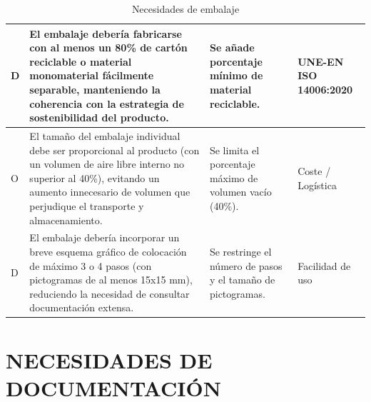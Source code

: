\documentclass[11pt,a4paper]{article}
\begin{document}
\begin{table}[H]
\begin{tabular}{|p{2.8cm}|p{5.5cm}|p{2.5cm}|p{3.0cm}|}
\hline
D & El embalaje debería fabricarse con al menos un 80\% de cartón reciclable o material monomaterial fácilmente separable, manteniendo la coherencia con la estrategia de sostenibilidad del producto. & Se añade porcentaje mínimo de material reciclable. & UNE-EN ISO 14006:2020 \\
\hline
O & El tamaño del embalaje individual debe ser proporcional al producto (con un volumen de aire libre interno no superior al 40\%), evitando un aumento innecesario de volumen que perjudique el transporte y almacenamiento. & Se limita el porcentaje máximo de volumen vacío (40\%). & Coste / Logística \\
\hline
D & El embalaje debería incorporar un breve esquema gráfico de colocación de máximo 3 o 4 pasos (con pictogramas de al menos 15x15 mm), reduciendo la necesidad de consultar documentación extensa. & Se restringe el número de pasos y el tamaño de pictogramas. & Facilidad de uso \\
\hline
\end{tabular}
\caption{Necesidades de embalaje}
\end{table}

\newpage

\section{NECESIDADES DE DOCUMENTACIÓN}

\vspace{0.5cm}
\end{document}
